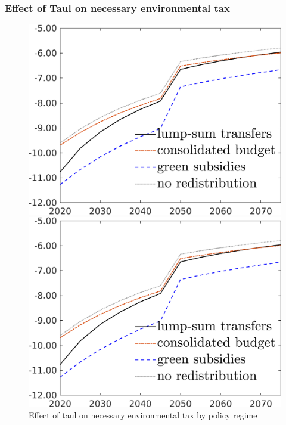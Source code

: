 \subsubsection{Effect of Taul on necessary environmental tax}


\begin{figure}[h!!]
	\centering
	\caption{Effect of taul on necessary environmental tax by policy regime }\label{fig:CompTaul_TAUF}
	
	\begin{minipage}[]{0.32\textwidth}
		\includegraphics[width=1\textwidth]{../../codding_model/own_basedOnFried/optimalPol_010922_revision/figures/all_5Sept22/TAUFCO2_PerDifTAUL_spillover0_nsk0_xgr0_sep1_LFlimit1_emsbase0_countec0_GovRev1_etaa0.79_lgd1.png}
	\end{minipage}
\begin{minipage}[]{0.32\textwidth}
	\includegraphics[width=1\textwidth]{../../codding_model/own_basedOnFried/optimalPol_010922_revision/figures/all_5Sept22/TAUFCO2_PerDifTAUL_spillover0_nsk0_xgr0_sep1_LFlimit1_emsbase0_countec0_GovRev1_etaa0.79_lgd1.png}
\end{minipage}
\end{figure}

